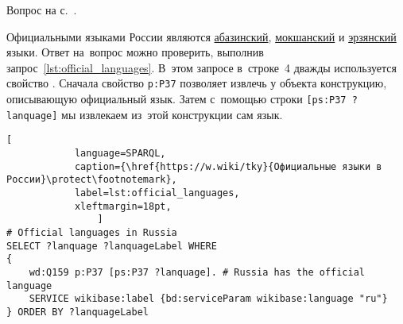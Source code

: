 \begin{task}
    \label{answer:official_language}
    \AnswerBackref Вопрос на с.~\pageref{lst:List_of_historical_countries}.


Официальными языками России являются 
    \href{https://w.wiki/myv}{абазинский}, 
    \href{https://w.wiki/myx}{мокшанский} 
    и \href{https://w.wiki/myy}{эрзянский} языки. 
    Ответ на~вопрос можно проверить, выполнив запрос~\ref{lst:official_languages}. 
    В~этом запросе в~строке~4 дважды используется свойство . 
    Сначала свойство \lstinline|p:P37| позволяет извлечь у объекта  конструкцию, 
    описывающую официальный язык. 
    Затем с~помощью строки \lstinline|[ps:P37 ?lanquage]| мы извлекаем из~этой конструкции сам язык.
	
\begin{lstlisting}[ 
            language=SPARQL, 
            caption={\href{https://w.wiki/tky}{Официальные языки в России}\protect\footnotemark},
            label=lst:official_languages,
            xleftmargin=18pt, 
                ]
# Official languages in Russia
SELECT ?lanquage ?lanquageLabel WHERE
{ 
	wd:Q159 p:P37 [ps:P37 ?lanquage]. # Russia has the official language
	SERVICE wikibase:label {bd:serviceParam wikibase:language "ru"}
} ORDER BY ?lanquageLabel
\end{lstlisting}
\end{task}





\hfil{}\hfil%


